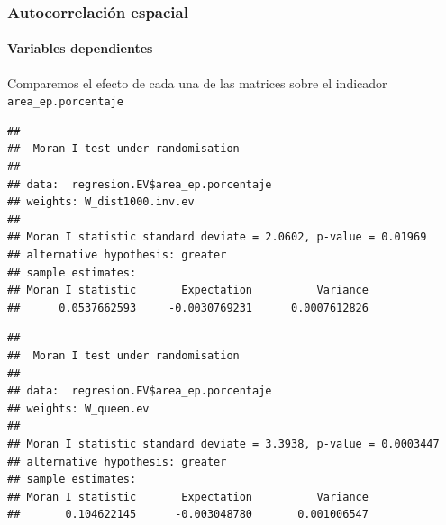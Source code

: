 \documentclass[12pt,]{book}
\newenvironment{Shaded}{\begin{snugshade}}{\end{snugshade}}
\newcommand{\KeywordTok}[1]{\textcolor[rgb]{0.13,0.29,0.53}{\textbf{#1}}}
\newcommand{\DataTypeTok}[1]{\textcolor[rgb]{0.13,0.29,0.53}{#1}}
\newcommand{\OtherTok}[1]{\textcolor[rgb]{0.56,0.35,0.01}{#1}}
\newcommand{\OperatorTok}[1]{\textcolor[rgb]{0.81,0.36,0.00}{\textbf{#1}}}
\newcommand{\NormalTok}[1]{#1}
\let\oldparagraph\paragraph
\renewcommand{\paragraph}[1]{\oldparagraph{#1}\mbox{}}
\begin{document}
\subsubsection{Autocorrelación
espacial}\label{autocorrelacion-espacial-1}

\paragraph{Variables dependientes}\label{variables-dependientes-1}

Comparemos el efecto de cada una de las matrices sobre el indicador
\texttt{area\_ep.porcentaje}

\begin{Shaded}
\end{Shaded}

\begin{verbatim}
## 
##  Moran I test under randomisation
## 
## data:  regresion.EV$area_ep.porcentaje  
## weights: W_dist1000.inv.ev  
## 
## Moran I statistic standard deviate = 2.0602, p-value = 0.01969
## alternative hypothesis: greater
## sample estimates:
## Moran I statistic       Expectation          Variance 
##      0.0537662593     -0.0030769231      0.0007612826
\end{verbatim}

\begin{Shaded}
\end{Shaded}

\begin{verbatim}
## 
##  Moran I test under randomisation
## 
## data:  regresion.EV$area_ep.porcentaje  
## weights: W_queen.ev  
## 
## Moran I statistic standard deviate = 3.3938, p-value = 0.0003447
## alternative hypothesis: greater
## sample estimates:
## Moran I statistic       Expectation          Variance 
##       0.104622145      -0.003048780       0.001006547
\end{verbatim}

\begin{Shaded}
\end{Shaded}
\end{document}
